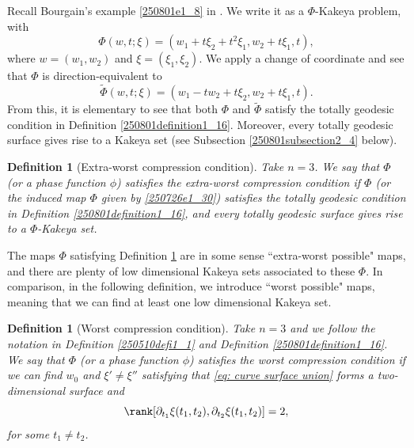 \documentclass{article}
\numberwithin{equation}{section}
\theoremstyle{plain}
\newtheorem{definition}[theorem]{Definition}
\begin{document}
Recall Bourgain's example \eqref{250801e1_8} in \cite{Bou91}. We write it as a $\Phi$-Kakeya problem, with 
\begin{equation}\label{250930e1_46}
    \Phi(w, t; \xi)= (w_1+ t\xi_2+ t^2\xi_1, w_2+ t\xi_1, t),
\end{equation}
where $w=(w_1, w_2)$ and $\xi=(\xi_1, \xi_2)$. 
We apply a change of coordinate and see that $\Phi$ is direction-equivalent to 
\begin{equation}\label{260526e1_53}
    \widetilde{\Phi}(w, t; \xi)= 
    (w_1- tw_2+ t\xi_2, w_2+ t\xi_1, t).
\end{equation}
From this, it is elementary to see that both $\Phi$ and $\widetilde{\Phi}$ satisfy the totally geodesic condition in Definition \ref{250801definition1_16}. Moreover, every totally geodesic surface gives rise to a Kakeya set (see Subsection \ref{250801subsection2_4} below). 

\begin{definition}[Extra-worst compression condition]\label{250801defi1_17zz}
Take $n=3$.
    We say that $\Phi$ (or a phase function $\phi$) satisfies the extra-worst compression condition if $\Phi$ (or the induced map $\Phi$ given by \eqref{250726e1_30}) satisfies the totally geodesic condition in Definition \ref{250801definition1_16}, and every totally geodesic surface gives rise to a $\Phi$-Kakeya set. 
\end{definition}



The maps $\Phi$ satisfying Definition \ref{250801defi1_17zz} are in some sense ``extra-worst possible" maps, and there are plenty of low dimensional Kakeya sets associated to these $\Phi$. In comparison, in the following definition, we introduce ``worst possible" maps, meaning that we can find at least one low dimensional Kakeya set. 




\begin{definition}[Worst compression condition]\label{260615defi1_19}
Take $n=3$ and we follow the notation in Definition \ref{250510defi1_1} and Definition \ref{250801definition1_16}. We say that $\Phi$ (or a phase function $\phi$) satisfies the worst compression condition if 
we can find $w_0$ and $\xi'\neq \xi''$ satisfying that 
\eqref{eq: curve surface union} forms a two-dimensional surface and 
\begin{equation}
        \rank[\partial_{t_1} \xi(t_1, t_2), \partial_{t_2} \xi(t_1, t_2)]= 2, 
    \end{equation}
    for some $t_1\neq t_2$. 
\end{definition}
\end{document}
